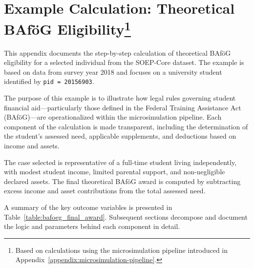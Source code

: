 

\newpage
\section[Example Calculation: Theoretical BAföG Eligibility]{Example Calculation: Theoretical BAföG Eligibility\footnote{Based on calculations using the microsimulation pipeline introduced in Appendix~\ref{appendix:microsimulation-pipeline}.}}
\label{appendix:simulation-example}

This appendix documents the step-by-step calculation of theoretical BAföG eligibility for a selected individual from the SOEP-Core dataset. The example is based on data from survey year 2018 and focuses on a university student identified by \texttt{pid = 20156903}.

The purpose of this example is to illustrate how legal rules governing student financial aid—particularly those defined in the Federal Training Assistance Act (BAföG)—are operationalized within the microsimulation pipeline. Each component of the calculation is made transparent, including the determination of the student's assessed need, applicable supplements, and deductions based on income and assets.

The case selected is representative of a full-time student living independently, with modest student income, limited parental support, and non-negligible declared assets. The final theoretical BAföG award is computed by subtracting excess income and asset contributions from the total assessed need.

A summary of the key outcome variables is presented in Table~\ref{table:bafoeg_final_award}. Subsequent sections decompose and document the logic and parameters behind each component in detail.







